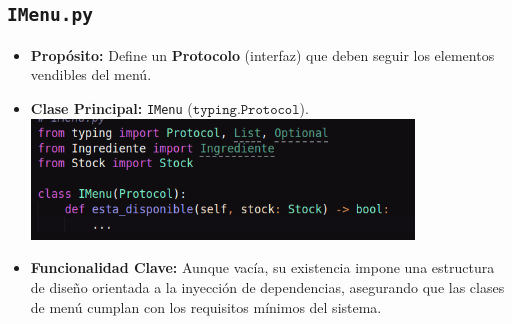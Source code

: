 \documentclass[a4paper, 12pt]{article}
\begin{document}
\subsection{\texttt{IMenu.py}}
\begin{itemize}
    \item \textbf{Propósito:} Define un \textbf{Protocolo} (interfaz) que deben seguir los elementos vendibles del menú.
    \item \textbf{Clase Principal:} \texttt{IMenu} ($\texttt{typing.Protocol}$).\\
    \includegraphics[width=0.8\textwidth]{images/3.png}
    
    \item \textbf{Funcionalidad Clave:} Aunque vacía, su existencia impone una estructura de diseño orientada a la inyección de dependencias, asegurando que las clases de menú cumplan con los requisitos mínimos del sistema.

\end{itemize}
\end{document}

